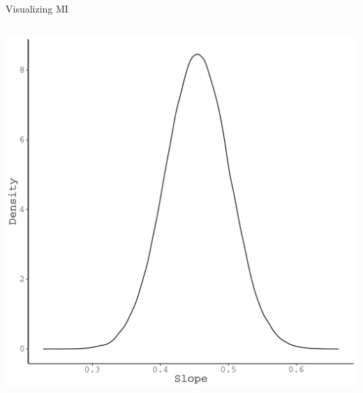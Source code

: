 \documentclass{beamer}\usepackage[]{graphicx}\usepackage[]{color}
\newenvironment{knitrout}{}{} %
\begin{document}
\begin{frame}{Visualizing MI}
\begin{columns}
\begin{column}{0.5\textwidth}
\begin{knitrout}
{\centering \includegraphics[width=0.9\linewidth]{figure/unnamed-chunk-47-1} 

}



\end{knitrout}

\end{column}
\end{columns}

\end{frame}

\end{document}
